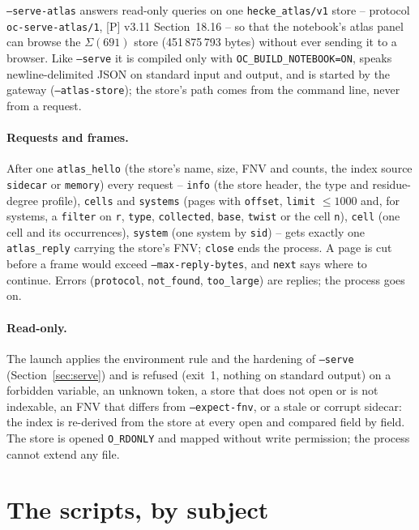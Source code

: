 \documentclass[11pt,openany]{report}
\newcommand{\cli}[1]{\texttt{#1}}
\begin{document}
\cli{--serve-atlas} answers read-only queries on one \texttt{hecke\_atlas/v1} store -- protocol
\texttt{oc-serve-atlas/1}, [P] v3.11 Section~18.16 -- so that the notebook's atlas panel can browse the
$\Sigma(691)$ store (451\,875\,793 bytes) without ever sending it to a browser. Like \cli{--serve} it is
compiled only with \texttt{OC\_BUILD\_NOTEBOOK=ON}, speaks newline-delimited JSON on standard input and
output, and is started by the gateway (\texttt{--atlas-store}); the store's path comes from the command
line, never from a request.



\paragraph{Requests and frames.} After one \texttt{atlas\_hello} (the store's name, size, FNV and counts,
the index source \texttt{sidecar} or \texttt{memory}) every request -- \texttt{info} (the store header,
the type and residue-degree profile), \texttt{cells} and \texttt{systems} (pages with \texttt{offset},
\texttt{limit} $\le 1000$ and, for systems, a \texttt{filter} on \texttt{r}, \texttt{type},
\texttt{collected}, \texttt{base}, \texttt{twist} or the cell \texttt{n}), \texttt{cell} (one cell and
its occurrences), \texttt{system} (one system by \texttt{sid}) -- gets exactly one \texttt{atlas\_reply}
carrying the store's FNV; \texttt{close} ends the process. A page is cut before a frame would exceed
\cli{--max-reply-bytes}, and \texttt{next} says where to continue. Errors (\texttt{protocol},
\texttt{not\_found}, \texttt{too\_large}) are replies; the process goes on.

\paragraph{Read-only.} The launch applies the environment rule and the hardening of \cli{--serve}
(Section~\ref{sec:serve}) and is refused (exit~1, nothing on standard output) on a forbidden variable, an
unknown token, a store that does not open or is not indexable, an FNV that differs from
\cli{--expect-fnv}, or a stale or corrupt sidecar: the index is re-derived from the store at every open
and compared field by field. The store is opened \texttt{O\_RDONLY} and mapped without write permission;
the process cannot extend any file.

\section{The scripts, by subject}\label{sec:morescripts}
\end{document}
